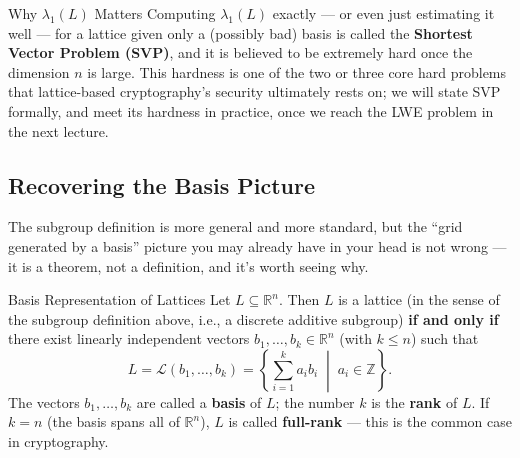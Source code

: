\begin{rmkbox}{Why $\lambda_1(L)$ Matters}
Computing $\lambda_1(L)$ exactly --- or even just estimating it well --- for a lattice given only a (possibly bad) basis is called the \textbf{Shortest Vector Problem (SVP)}, and it is believed to be extremely hard once the dimension $n$ is large. This hardness is one of the two or three core hard problems that lattice-based cryptography's security ultimately rests on; we will state SVP formally, and meet its hardness in practice, once we reach the LWE problem in the next lecture.
\end{rmkbox}

\subsection{Recovering the Basis Picture}
\label{sec:L1:recovering-the-basis-picture}

The subgroup definition is more general and more standard, but the ``grid generated by a basis'' picture you may already have in your head is not wrong --- it is a theorem, not a definition, and it's worth seeing why.

\begin{factbox}{Basis Representation of Lattices}
Let $L \subseteq \mathbb{R}^n$. Then $L$ is a lattice (in the sense of the subgroup definition above, i.e., a discrete additive subgroup) \textbf{if and only if} there exist linearly independent vectors $b_1, \ldots, b_k \in \mathbb{R}^n$ (with $k \le n$) such that
$$
L = \mathcal{L}(b_1,\ldots,b_k) = \left\{ \sum_{i=1}^{k} a_i b_i \;\middle|\; a_i \in \mathbb{Z} \right\}.
$$
The vectors $b_1,\ldots,b_k$ are called a \textbf{basis} of $L$; the number $k$ is the \textbf{rank} of $L$. If $k=n$ (the basis spans all of $\mathbb{R}^n$), $L$ is called \textbf{full-rank} --- this is the common case in cryptography.
\end{factbox}

